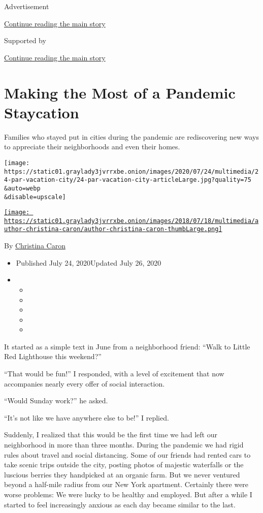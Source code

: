 Advertisement

\protect\hyperlink{after-top}{Continue reading the main story}

Supported by

\protect\hyperlink{after-sponsor}{Continue reading the main story}

\hypertarget{making-the-most-of-a-pandemic-staycation}{%
\section{Making the Most of a Pandemic
Staycation}\label{making-the-most-of-a-pandemic-staycation}}

Families who stayed put in cities during the pandemic are rediscovering
new ways to appreciate their neighborhoods and even their homes.

\texttt{[image: https://static01.graylady3jvrrxbe.onion/images/2020/07/24/multimedia/24-par-vacation-city/24-par-vacation-city-articleLarge.jpg?quality=75\\\&auto=webp\\\&disable=upscale]}

\href{https://www.nytimes3xbfgragh.onion/by/christina-caron}{\texttt{[image: https://static01.graylady3jvrrxbe.onion/images/2018/07/18/multimedia/author-christina-caron/author-christina-caron-thumbLarge.png]}}

By
\href{https://www.nytimes3xbfgragh.onion/by/christina-caron}{Christina
Caron}

\begin{itemize}
\item
  Published July 24, 2020Updated July 26, 2020
\item
  \begin{itemize}
  \item
  \item
  \item
  \item
  \item
  \end{itemize}
\end{itemize}

It started as a simple text in June from a neighborhood friend: ``Walk
to Little Red Lighthouse this weekend?''

``That would be fun!'' I responded, with a level of excitement that now
accompanies nearly every offer of social interaction.

``Would Sunday work?'' he asked.

``It's not like we have anywhere else to be!'' I replied.

Suddenly, I realized that this would be the first time we had left our
neighborhood in more than three months. During the pandemic we had rigid
rules about travel and social distancing. Some of our friends had rented
cars to take scenic trips outside the city, posting photos of majestic
waterfalls or the luscious berries they handpicked at an organic farm.
But we never ventured beyond a half-mile radius from our New York
apartment. Certainly there were worse problems: We were lucky to be
healthy and employed. But after a while I started to feel increasingly
anxious as each day became similar to the last.


